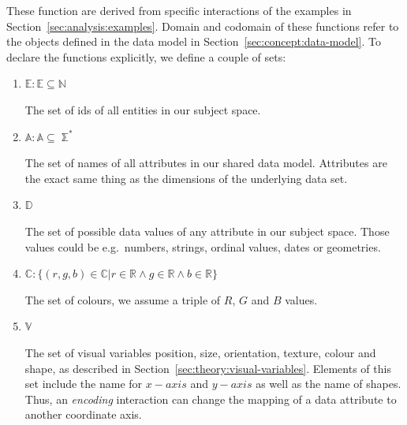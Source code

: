 \documentclass{article}
\begin{document}
These function are derived from specific interactions of the examples in Section~\ref{sec:analysis:examples}.
Domain and codomain of these functions refer to the objects defined in the data model in Section~\ref{sec:concept:data-model}.
To declare the functions explicitly, we define a couple of sets:
\begin{enumerate}
    \item
        $ \mathbb{E} : \mathbb{E} \subseteq \mathbb{N} $

        The set of ids of all entities in our subject space.
    \item
        $ \mathbb{A} : \mathbb{A} \subseteq \mathbb{\sum^*} $

        The set of names of all attributes in our shared data model.
        Attributes are the exact same thing as the dimensions of the underlying data set.
    \item
        $ \mathbb{D} $

        The set of possible data values of any attribute in our subject space. Those values could be e.g.\ numbers, strings, ordinal values, dates or geometries.
    \item
        $ \mathbb{C}: \{ (r,g,b) \in \mathbb{C} | r \in \mathbb{R} \land g \in \mathbb{R} \land b \in \mathbb{R} \}$

        The set of colours, we assume a triple of $R$, $G$ and $B$ values.
    \item
        $ \mathbb{V} $

        The set of visual variables position, size, orientation, texture, colour and shape, as described in Section~\ref{sec:theory:visual-variables}.
        Elements of this set include the name for $x-axis$ and $y-axis$ as well as the name of shapes.
        Thus, an \emph{encoding} interaction can change the mapping of a data attribute to another coordinate axis.
\end{enumerate}
\end{document}
